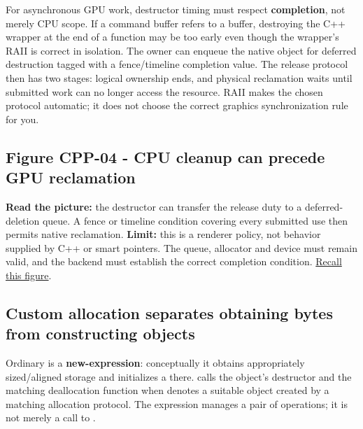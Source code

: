 For asynchronous GPU work, destructor timing must respect \textbf{completion}, not merely CPU scope. If a command buffer refers to a buffer, destroying the C++ wrapper at the end of a function may be too early even though the wrapper's RAII is correct in isolation. The owner can enqueue the native object for deferred destruction tagged with a fence/timeline completion value. The release protocol then has two stages: logical ownership ends, and physical reclamation waits until submitted work can no longer access the resource. RAII makes the chosen protocol automatic; it does not choose the correct graphics synchronization rule for you.

\subsection{Figure CPP-04 - CPU cleanup can precede GPU reclamation}\label{05-engine-i-ch004-figure-cpp-04---cpu-cleanup-can-precede-gpu-reclamation}

\hypertarget{05-engine-i-ch004-figure-cpp-04---cpu-cleanup-can-precede-gpu-reclamation}{}


\textbf{Read the picture:} the destructor can transfer the release duty to a deferred-deletion queue. A fence or timeline condition covering every submitted use then permits native reclamation. \textbf{Limit:} this is a renderer policy, not behavior supplied by C++ or smart pointers. The queue, allocator and device must remain valid, and the backend must establish the correct completion condition. \hyperref[appendix-960160274237-four-figure-briefs]{Recall this figure}.

\subsection{Custom allocation separates obtaining bytes from constructing objects}\label{05-engine-i-ch004-custom-allocation-separates-obtaining-bytes-from-constructing-objects}

\hypertarget{05-engine-i-ch004-custom-allocation-separates-obtaining-bytes-from-constructing-objects}{}

Ordinary  is a \textbf{new-expression}: conceptually it obtains appropriately sized/aligned storage and initializes a  there.  calls the object's destructor and the matching deallocation function when  denotes a suitable object created by a matching allocation protocol. The expression manages a pair of operations; it is not merely a call to .

